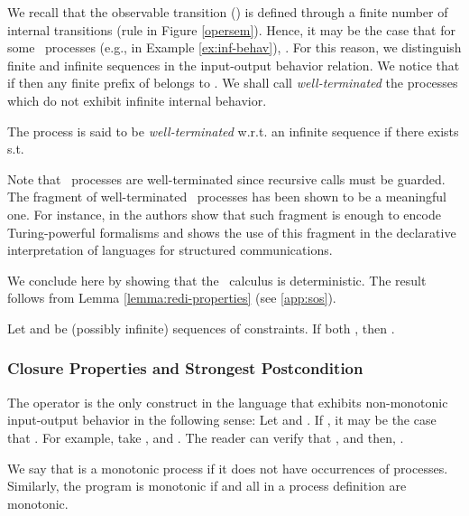 \documentclass{tlp}
\begin{document}
We recall that  the observable transition () is defined through a finite number of internal transitions (rule  in Figure \ref{opersem}). Hence,   it may be the case that for some \utcc\ processes (e.g.,  in Example \ref{ex:inf-behav}), .  For this reason, we distinguish finite and infinite sequences in the input-output behavior relation.  We notice that if  then any finite prefix  of  belongs to .
 We shall call \emph{well-terminated}  the  processes which do not exhibit infinite internal behavior.

 \begin{definition}\label{def:wellterminated}
The process  is said to be \emph{well-terminated} w.r.t. an infinite sequence  if  there exists  s.t.   
\end{definition}

 Note that  \tccp\ processes are well-terminated since recursive calls must be  guarded. The fragment of well-terminated \utcc\ processes has been shown to be a meaningful one. For instance, in \cite{Olarte:08:PPDP} the authors show that such fragment is enough to  encode  Turing-powerful formalisms and  \cite{Lopez-Places09} shows the use of this fragment in the  declarative interpretation of languages for structured communications. 

We conclude here by showing that the \utcc\ calculus is deterministic. The result follows from Lemma \ref{lemma:redi-properties} (see  \ref{app:sos}).\begin{theorem}[Determinism] \label{theo:SOS-determinism}
Let  and  be (possibly infinite) sequences of constraints. If both
,  then . 
\end{theorem}




\subsubsection{Closure Properties and Strongest Postcondition}
The  operator is the only construct in the language that exhibits 
non-monotonic input-output behavior in the following sense: Let  and  .  If , it may be the case that . For example, take ,  and  .
The reader can verify that  ,  and then,  . 

\begin{definition}\label{def:monotonic}
We say that  is a monotonic process if it does not have occurrences of  processes. Similarly, the program  is monotonic if  and all  in a process definition  are monotonic. 
\end{definition}
\end{document}
